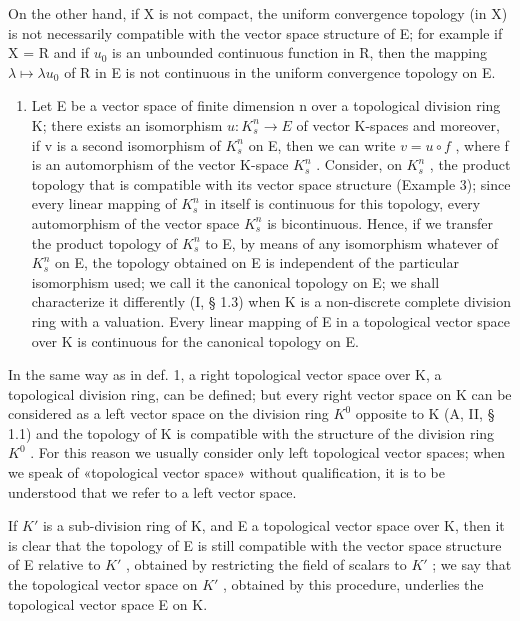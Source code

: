 On the other hand, if X is not compact, the uniform convergence topology (in X) is not necessarily compatible with the vector space structure of E; for example if X = R and if \(u_{0}\) is an unbounded continuous function in R, then the mapping \(\lambda \mapsto \lambda u_{0}\) of R in E is not continuous in the uniform convergence topology on E.

\begin{enumerate}
\def\labelenumi{\arabic{enumi})}
\setcounter{enumi}{4}
\tightlist
\item
  Let E be a vector space of finite dimension n over a topological division ring K; there exists an isomorphism \(u:K_{s}^{n}\to E\) of vector K-spaces and moreover, if v is a second isomorphism of \(K_{s}^{n}\) on E, then we can write \(v=u\circ f\) , where f is an automorphism of the vector K-space \(K_{s}^{n}\) . Consider, on \(K_{s}^{n}\) , the product topology that is compatible with its vector space structure (Example 3); since every linear mapping of \(K_{s}^{n}\) in itself is continuous for this topology, every automorphism of the vector space \(K_{s}^{n}\) is bicontinuous. Hence, if we transfer the product topology of \(K_{s}^{n}\) to E, by means of any isomorphism whatever of \(K_{s}^{n}\) on E, the topology obtained on E is independent of the particular isomorphism used; we call it the canonical topology on E; we shall characterize it differently (I, § 1.3) when K is a non-discrete complete division ring with a valuation. Every linear mapping of E in a topological vector space over K is continuous for the canonical topology on E.
\end{enumerate}

In the same way as in def. 1, a right topological vector space over K, a topological division ring, can be defined; but every right vector space on K can be considered as a left vector space on the division ring \(K^{0}\) opposite to K (A, II, § 1.1) and the topology of K is compatible with the structure of the division ring \(K^{0}\) . For this reason we usually consider only left topological vector spaces; when we speak of «topological vector space» without qualification, it is to be understood that we refer to a left vector space.

If \(K'\) is a sub-division ring of K, and E a topological vector space over K, then it is clear that the topology of E is still compatible with the vector space structure of E relative to \(K'\) , obtained by restricting the field of scalars to \(K'\) ; we say that the topological vector space on \(K'\) , obtained by this procedure, underlies the topological vector space E on K.

